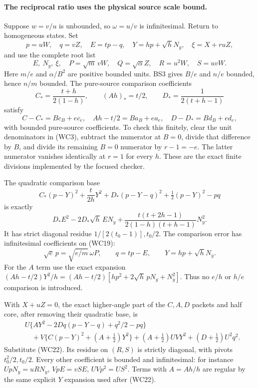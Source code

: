 \paragraph{The reciprocal ratio uses the physical source scale bound.}
Suppose $w=v/u$ is unbounded, so $\omega=u/v$ is infinitesimal.
Return to homogeneous states. Set
\[
 p=uW,\quad q=vZ,\quad E=tp-q,\quad
 Y=hp+\sqrt hN_y,\quad \xi=X+ruZ,
\]
and use the complete root list
\[
 E,\ N_y,\ \xi,\quad P=\sqrt m\,vW,\quad
 Q=\sqrt\alpha Z,\quad R=u^2W,\quad S=uvW.          \tag{WC19}
\]
Here $m/e$ and $\alpha/B^2$ are positive bounded units. BS3 gives
$B/e$ and $n/e$ bounded, hence $n/m$ bounded. The pure-source
comparison coefficients
\[
 C_*=\frac{t+h}{2(1-h)},\qquad (Ah)_*=t/2,\qquad
 D_*=\frac1{2(t+h-1)}
\]
satisfy
\[
 C-C_*=B c_B+e c_e,\quad Ah-t/2=B a_B+e a_e,
 \quad D-D_*=B d_B+e d_e,                            \tag{WC20}
\]
with bounded pure-source coefficients. To check this finitely,
clear the unit denominators in (WC3), subtract the numerator at
$B=0$, divide that difference by $B$, and divide its remaining
$B=0$ numerator by $r-1=-e$. The latter numerator vanishes
identically at $r=1$ for every $h$. These are the exact finite
divisions implemented by the focused checker.

The quadratic comparison base
\[
 C_*(p-Y)^2+\frac{t}{2h}Y^2+D_*(p-Y-q)^2
                         +\tfrac12(p-Y)^2-pq
\]
is exactly
\[
 D_*E^2-2D_*\sqrt h\,EN_y+
 \frac{t(t+2h-1)}{2(1-h)(t+h-1)}N_y^2.              \tag{WC21}
\]
It has strict diagonal residue $1/[2(t_0-1)],t_0/2$.
The comparison error has infinitesimal coefficients on (WC19):
\[
 \sqrt e\,p=\sqrt{e/m}\,\omega P,\qquad q=tp-E,
 \qquad Y=hp+\sqrt hN_y.                            \tag{WC22}
\]
For the $A$ term use the exact expansion
$(Ah-t/2)Y^2/h=(Ah-t/2)
[hp^2+2\sqrt h\,pN_y+N_y^2]$. Thus no $e/h$ or $h/e$
comparison is introduced.

With $X+uZ=0$, the exact higher-angle part of the $C,A,D$ packets
and half core, after removing their quadratic base, is
\[
\begin{aligned}
 &U\{AY^2-2Dq(p-Y-q)+q^2/2-pq\}\\
 &\quad+V\{C(p-Y)^2+(A+\tfrac12)Y^2\}
 +(A+\tfrac12)UVY^2+(D+\tfrac12)U^2q^2.             
\end{aligned} \tag{WC23}
\]
Substitute (WC22). Its residue on $(R,S)$ is strictly diagonal,
with pivots $t_0^2/2,t_0/2$. Every other coefficient is bounded
and infinitesimal: for instance $UpN_y=uRN_y$, $VpE=vSE$,
$UVp^2=US^2$. Terms with $A=Ah/h$ are regular by the same
explicit $Y$ expansion used after (WC22).

